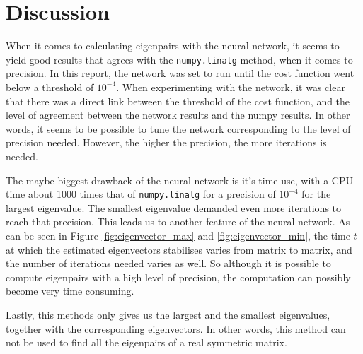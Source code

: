 \section{Discussion}
\label{sec:discussion}



When it comes to calculating eigenpairs with the neural network, it seems to yield good results that agrees with the \texttt{numpy.linalg} method, when it comes to precision. In this report, the network was set to run until the cost function went below a threshold of $10^{-4}$. When experimenting with the network, it was clear that there was a direct link between the threshold of the cost function, and the level of agreement between the network results and the numpy results. In other words, it seems to be possible to tune the network corresponding to the level of precision needed. However, the higher the precision, the more iterations is needed.

The maybe biggest drawback of the neural network is it's time use, with a CPU time about 1000 times that of \texttt{numpy.linalg} for a precision of $10^{-4}$ for the largest eigenvalue. The smallest eigenvalue demanded even more iterations to reach that precision. This leads us to another feature of the neural network. As can be seen in Figure \ref{fig:eigenvector_max} and \ref{fig:eigenvector_min}, the time $t$ at which the estimated eigenvectors stabilises varies from matrix to matrix, and the number of iterations needed varies as well. So although it is possible to compute eigenpairs with a high level of precision, the computation can possibly become very time consuming.

Lastly, this methods only gives us the largest and the smallest eigenvalues, together with the corresponding eigenvectors. In other words, this method can not be used to find all the eigenpairs of a real symmetric matrix.
